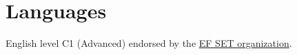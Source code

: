 \documentclass[11pt,a4paper]{moderncv}
\begin{document}
\section{Languages}
English level C1 (Advanced) endorsed by the \href{https://www.efset.org/cert/FoUsdr}{EF SET organization}.
\\
%
%
%
%





%
%
%
%

\ %
\end{document}
